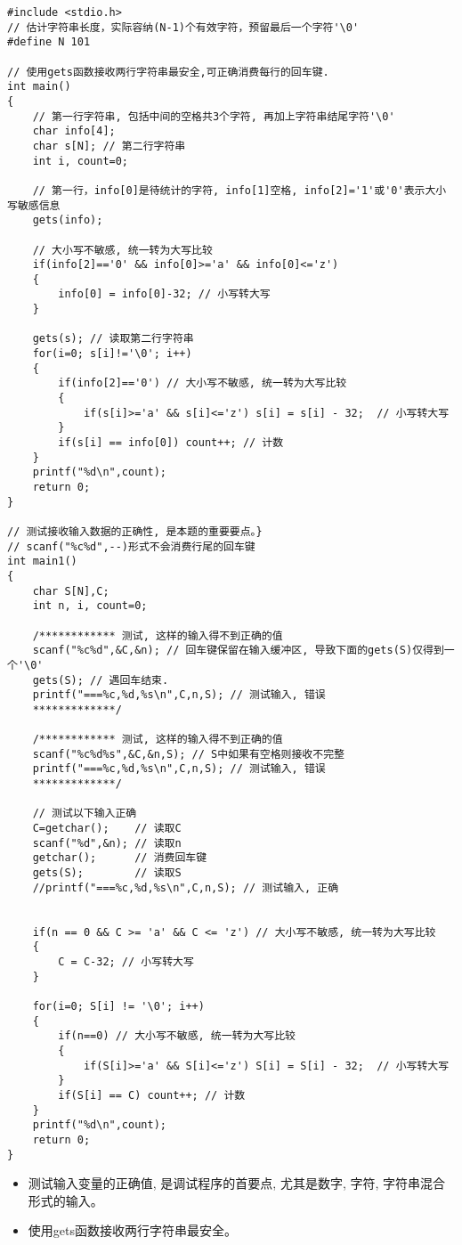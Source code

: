 \begin{lstlisting}
#include <stdio.h>
// 估计字符串长度，实际容纳(N-1)个有效字符，预留最后一个字符'\0'
#define N 101 

// 使用gets函数接收两行字符串最安全,可正确消费每行的回车键.
int main()
{
	// 第一行字符串, 包括中间的空格共3个字符, 再加上字符串结尾字符'\0' 
	char info[4]; 
	char s[N]; // 第二行字符串 
	int i, count=0;
	
	// 第一行，info[0]是待统计的字符, info[1]空格, info[2]='1'或'0'表示大小写敏感信息
	gets(info);  
	
	// 大小写不敏感, 统一转为大写比较 
	if(info[2]=='0' && info[0]>='a' && info[0]<='z') 
	{
		info[0] = info[0]-32; // 小写转大写 
	} 
	
	gets(s); // 读取第二行字符串 
	for(i=0; s[i]!='\0'; i++) 
	{
		if(info[2]=='0') // 大小写不敏感, 统一转为大写比较 
		{
			if(s[i]>='a' && s[i]<='z') s[i] = s[i] - 32;  // 小写转大写 
		}
		if(s[i] == info[0]) count++; // 计数 
	}
	printf("%d\n",count);
	return 0;
} 

// 测试接收输入数据的正确性, 是本题的重要要点。}
// scanf("%c%d",--)形式不会消费行尾的回车键 
int main1()
{
	char S[N],C;
	int n, i, count=0;
	
	/************ 测试, 这样的输入得不到正确的值 
	scanf("%c%d",&C,&n); // 回车键保留在输入缓冲区, 导致下面的gets(S)仅得到一个'\0' 
	gets(S); // 遇回车结束.
	printf("===%c,%d,%s\n",C,n,S); // 测试输入, 错误 
	*************/ 
	
	/************ 测试, 这样的输入得不到正确的值
	scanf("%c%d%s",&C,&n,S); // S中如果有空格则接收不完整 
	printf("===%c,%d,%s\n",C,n,S); // 测试输入, 错误 
	*************/ 
	
	// 测试以下输入正确 
	C=getchar();    // 读取C 
	scanf("%d",&n); // 读取n 
	getchar();      // 消费回车键 
	gets(S);        // 读取S 
	//printf("===%c,%d,%s\n",C,n,S); // 测试输入, 正确 
	
	
	if(n == 0 && C >= 'a' && C <= 'z') // 大小写不敏感, 统一转为大写比较 
	{
		C = C-32; // 小写转大写 
	} 
	
	for(i=0; S[i] != '\0'; i++) 
	{
		if(n==0) // 大小写不敏感, 统一转为大写比较 
		{
			if(S[i]>='a' && S[i]<='z') S[i] = S[i] - 32;  // 小写转大写 
		}
		if(S[i] == C) count++; // 计数 
	}
	printf("%d\n",count);
	return 0;
} 
\end{lstlisting}

\begin{note}[要点]
	\begin{itemize}
		\item 测试输入变量的正确值, 是调试程序的首要点, 尤其是数字, 字符, 字符串混合形式的输入。
		\item 使用gets函数接收两行字符串最安全。
	\end{itemize}
	
\end{note}

